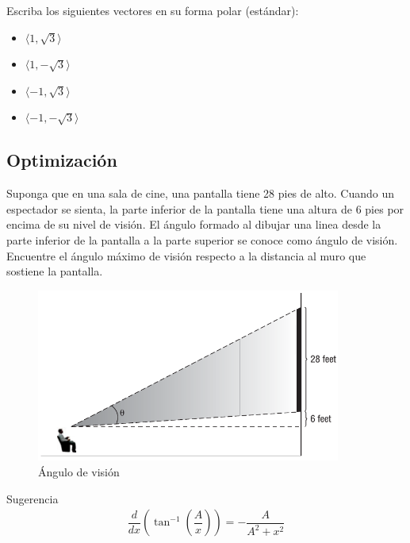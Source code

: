 {}
	\begin{problema}
		Escriba los siguientes vectores en su forma polar (estándar):
		\begin{itemize}
			\item $\langle 1, \sqrt{3}\rangle$ 
			\item $\langle 1, -\sqrt{3}\rangle$ 
			\item $\langle -1, \sqrt{3}\rangle$ 
			\item $\langle -1, -\sqrt{3}\rangle$ 
		\end{itemize}
		
	\end{problema}
	

\subsection{Optimización}

	\begin{problema}
		\label{exe:0776}
		Suponga que en una sala de cine, una pantalla tiene 28 pies de alto. Cuando un espectador se sienta, la parte inferior de la pantalla tiene una altura de 6 pies por encima de su nivel de visión. El ángulo formado al dibujar una linea desde la parte inferior de la pantalla a la parte superior se conoce como ángulo de visión. Encuentre el ángulo máximo de visión respecto a la distancia al muro que sostiene la pantalla.
	\end{problema}


{}
	\begin{figure}
		\centering
		\includegraphics[width=10cm]{./trig/angulo_vision.png}
		\caption{Ángulo de visión}
		\label{fig:angulo_vision}
	\end{figure}
	

{Sugerencia}
	\begin{align*}
		\dfrac{d}{dx}\left( \tan^{-1}\left( \dfrac{A}{x} \right) \right)=
		-\dfrac{A}{A^{2}+x^{2}}
	\end{align*}

